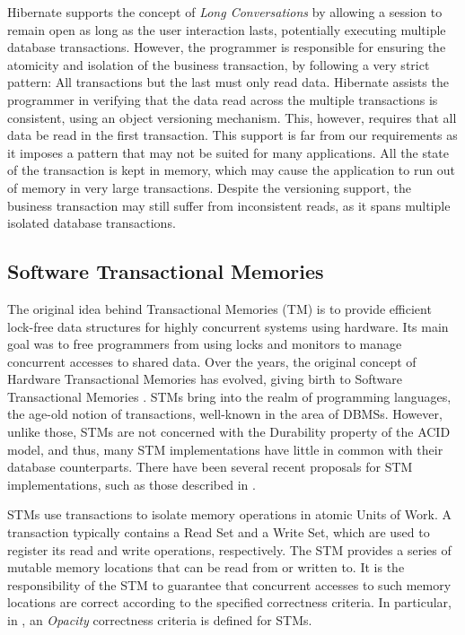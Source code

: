 \documentclass{llncs}
\begin{document}
Hibernate supports the concept of {\it Long Conversations} by allowing
a session to remain open as long as the user interaction lasts,
potentially executing multiple database transactions. However, the
programmer is responsible for ensuring the atomicity and isolation of
the business transaction, by following a very strict pattern: All
transactions but the last must only read data. Hibernate assists the
programmer in verifying that the data read across the multiple
transactions is consistent, using an object versioning
mechanism. This, however, requires that all data be read in the first
transaction. This support is far from our requirements as it imposes a
pattern that may not be suited for many applications.  All the state
of the transaction is kept in memory, which may cause the application
to run out of memory in very large transactions. Despite the
versioning support, the business transaction may still suffer from
inconsistent reads, as it spans multiple isolated database
transactions.


\subsection{Software Transactional Memories}
\label{sec:stm}

The original idea behind Transactional Memories (TM)
\cite{herlihy1993transactional} is to provide efficient lock-free data
structures for highly concurrent systems using hardware. Its main goal
was to free programmers from using locks and monitors to manage
concurrent accesses to shared data. Over the years, the original
concept of Hardware Transactional Memories has evolved, giving birth
to Software Transactional Memories \cite{shavit1997software}. STMs
bring into the realm of programming languages, the age-old notion of
transactions, well-known in the area of DBMSs. However, unlike those,
STMs are not concerned with the Durability property of the ACID model,
and thus, many STM implementations have little in common with their
database counterparts. There have been several recent proposals for
STM implementations, such as those described in
\cite{cachopo2006versioned, herlihy2003software,
  dice2006transactional}.

STMs use transactions to isolate memory operations in atomic Units of
Work. A transaction typically contains a Read Set and a Write Set,
which are used to register its read and write operations,
respectively. The STM provides a series of mutable memory locations
that can be read from or written to. It is the responsibility of the
STM to guarantee that concurrent accesses to such memory locations are
correct according to the specified correctness criteria. In
particular, in \cite{guerraoui2008correctness}, an {\it Opacity}
correctness criteria is defined for STMs.
\end{document}
